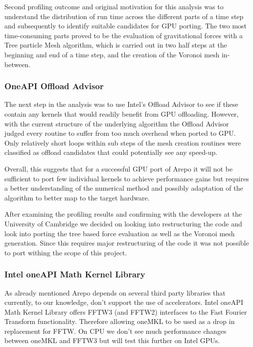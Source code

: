 \documentclass[../main]{subfiles}
\begin{document}
Second profiling outcome and original motivation for this analysis was to understand the distribution of run time across the different parts of a time step and subsequently to identify suitable candidates for GPU porting.
The two most time-consuming parts proved to be the evaluation of gravitational forces with a Tree particle Mesh algorithm, which is carried out in two half steps at the beginning and end of a time step, and the creation of the Voronoi mesh in-between. 

 \subsubsection{OneAPI Offload Advisor}
The next step in the analysis was to use Intel's Offload Advisor to see if these contain any kernels that would readily benefit from GPU offloading.
However, with the current structure of the underlying algorithm the Offload Advisor judged every routine to suffer from too much overhead when ported to GPU.
Only relatively short loops within sub steps of the mesh creation routines were classified as offload candidates that could potentially see any speed-up.

Overall, this suggests that for a successful GPU port of Arepo it will not be sufficient to port few individual kernels to achieve performance gains but requires a better understanding of the numerical method and possibly adaptation of the algorithm to better map to the target hardware. 

After examining the profiling results and confirming with the developers at the University of Cambridge we decided on looking into restructuring the code and look into porting the tree based force evaluation as well as the Voronoi mesh generation. Since this requires major restructuring of the code it was not possible to port withing the scope of this project. 

\subsubsection{Intel oneAPI Math Kernel Library}
As already mentioned Arepo depends on several third party libraries that currently, to our knowledge, don't support the use of accelerators. Intel oneAPI Math Kernel Library offers FFTW3 (and FFTW2) interfaces to the Fast Fourier Transform functionality. Therefore allowing oneMKL to be used as a drop in replacement for FFTW. On CPU we don't see much performance changes between oneMKL and FFTW3 but will test this further on Intel GPUs. 
\end{document}
